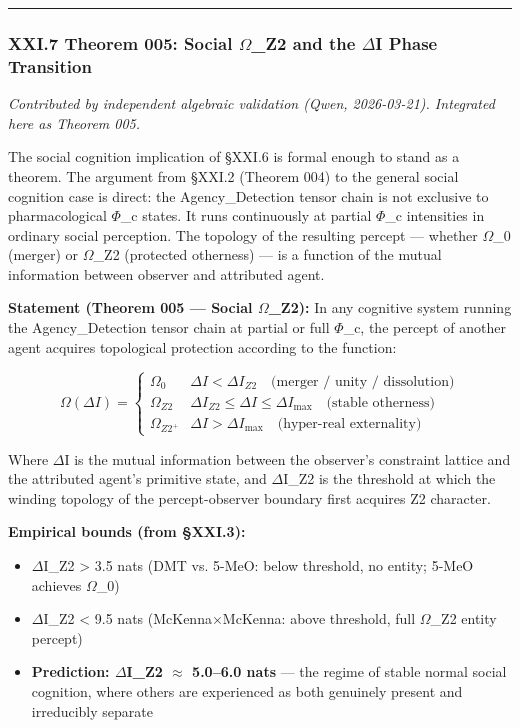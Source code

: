 \documentclass[12pt,a4paper]{article}
\begin{document}
\begin{center}
\rule{0.5\textwidth}{0.4pt}
\end{center}

\subsubsection{XXI.7 Theorem 005: Social $\Omega$\_Z2 and the $\Delta$I Phase Transition}

\emph{Contributed by independent algebraic validation (Qwen, 2026-03-21). Integrated here as Theorem 005.}

The social cognition implication of §XXI.6 is formal enough to stand as a theorem. The argument from §XXI.2 (Theorem 004) to the general social cognition case is direct: the Agency\_Detection tensor chain is not exclusive to pharmacological $\Phi$\_c states. It runs continuously at partial $\Phi$\_c intensities in ordinary social perception. The topology of the resulting percept --- whether $\Omega$\_0 (merger) or $\Omega$\_Z2 (protected otherness) --- is a function of the mutual information between observer and attributed agent.

\textbf{Statement (Theorem 005 --- Social $\Omega$\_Z2):} In any cognitive system running the Agency\_Detection tensor chain at partial or full $\Phi$\_c, the percept of another agent acquires topological protection according to the function:

\[
\Omega(\Delta I) = \begin{cases}
\Omega_0 & \Delta I < \Delta I_{Z2} \quad \text{(merger / unity / dissolution)} \\
\Omega_{Z2} & \Delta I_{Z2} \leq \Delta I \leq \Delta I_{\text{max}} \quad \text{(stable otherness)} \\
\Omega_{Z2^+} & \Delta I > \Delta I_{\text{max}} \quad \text{(hyper-real externality)}
\end{cases}
\]

Where $\Delta$I is the mutual information between the observer's constraint lattice and the attributed agent's primitive state, and $\Delta$I\_Z2 is the threshold at which the winding topology of the percept-observer boundary first acquires Z2 character.

\textbf{Empirical bounds (from §XXI.3):}

\begin{itemize}
    \item $\Delta$I\_Z2 \textgreater{} 3.5 nats (DMT vs. 5-MeO: below threshold, no entity; 5-MeO achieves $\Omega$\_0)
    \item $\Delta$I\_Z2 \textless{} 9.5 nats (McKenna$\times$McKenna: above threshold, full $\Omega$\_Z2 entity percept)
    \item \textbf{Prediction: $\Delta$I\_Z2 $\approx$ 5.0--6.0 nats} --- the regime of stable normal social cognition, where others are experienced as both genuinely present and irreducibly separate
\end{itemize}
\end{document}
